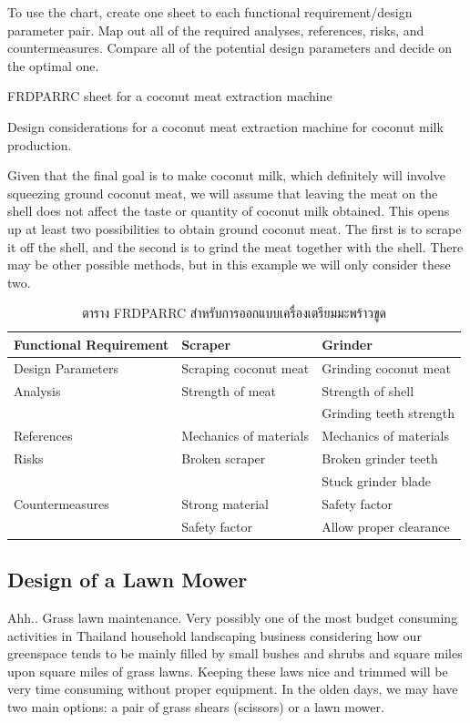 \documentclass[a4paper,openany,nobib]{tufte-book}
\begin{document}
To use the chart, create one sheet to each functional requirement/design
parameter pair. Map out all of the required analyses, references, risks,
and countermeasures. Compare all of the potential design parameters and
decide on the optimal one.

FRDPARRC sheet for a coconut meat extraction machine

Design considerations for a coconut meat extraction machine for coconut
milk production.

Given that the final goal is to make coconut milk, which definitely will
involve squeezing ground coconut meat, we will assume that leaving the
meat on the shell does not affect the taste or quantity of coconut milk
obtained. This opens up at least two possibilities to obtain ground
coconut meat. The first is to scrape it off the shell, and the second is
to grind the meat together with the shell. There may be other possible
methods, but in this example we will only consider these two.

\begin{table}[htbp]
\caption{ตาราง FRDPARRC สำหรับการออกแบบเครื่องเตรียมมะพร้าวขูด}
  \centering
  \begin{tabular}{lll}
    \toprule
    Functional Requirement & Scraper & Grinder \\
    \midrule
    Design Parameters & Scraping coconut meat & Grinding coconut meat \\
    Analysis & Strength of meat & Strength of shell \\
    && Grinding teeth strength \\
    References & Mechanics of materials & Mechanics of materials \\
    Risks & Broken scraper & Broken grinder teeth \\
    && Stuck grinder blade \\
    Countermeasures & Strong material & Safety factor \\
    & Safety factor & Allow proper clearance \\
    \bottomrule
  \end{tabular}
\end{table}

\subsection{Design of a Lawn Mower}
\label{sec:org860bb78}

Ahh.. Grass lawn maintenance. Very possibly one of the most budget
consuming activities in Thailand household landscaping business
considering how our greenspace tends to be mainly filled by small bushes
and shrubs and square miles upon square miles of grass lawns. Keeping
these laws nice and trimmed will be very time consuming without proper
equipment. In the olden days, we may have two main options: a pair of
grass shears (scissors) or a lawn mower.
\end{document}
